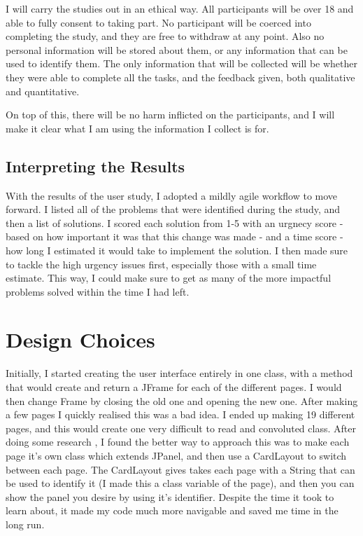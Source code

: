 I will carry the studies out in an ethical way. All participants will be over 18 and able to fully consent to taking part. No participant will be coerced into completing the study, and they are free to withdraw at any point. Also no personal information will be stored about them, or any information that can be used to identify them. The only information that will be collected will be whether they were able to complete all the tasks, and the feedback given, both qualitative and quantitative.

On top of this, there will be no harm inflicted on the participants, and I will make it clear what I am using the information I collect is for. 

\subsection{Interpreting the Results}

With the results of the user study, I adopted a mildly agile workflow to move forward. I listed all of the problems that were identified during the study, and then a list of solutions. I scored each solution from 1-5 with an urgnecy score - based on how important it was that this change was made - and a time score - how long I estimated it would take to implement the solution. I then made sure to tackle the high urgency issues first, especially those with a small time estimate. This way, I could make sure to get as many of the more impactful problems solved within the time I had left. 


\section{Design Choices}
Initially, I started creating the user interface entirely in one class, with a method that would create and return a JFrame for each of the different pages. I would then change Frame by closing the old one and opening the new one. After making a few pages I quickly realised this was a bad idea. I ended up making 19 different pages, and this would create one very difficult to read and convoluted class. After doing some research \cite{cardLayout}, I found the better way to approach this was to make each page it's own class which extends JPanel, and then use a CardLayout to switch between each page. The CardLayout gives takes each page with a String that can be used to identify it (I made this a class variable of the page), and then you can show the panel you desire by using it's identifier. Despite the time it took to learn about, it made my code much more navigable and saved me time in the long run.

